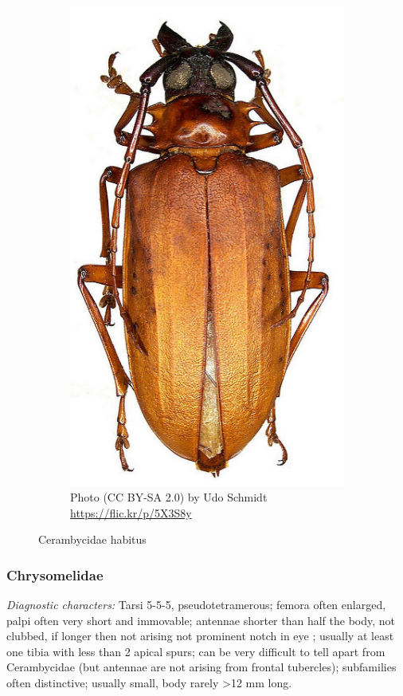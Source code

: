 \documentclass[letterpaper, 11pt]{article}
\begin{document}
\begin{figure}[ht!]
\begin{subfigure}[ht!]{0.27\textwidth}
    \includegraphics[width=\textwidth]{Cerambycid3}
  \caption{Photo (CC BY-SA 2.0) by Udo Schmidt \url{https://flic.kr/p/5X3S8y}}
  \label{fig:cerambycid3}
\end{subfigure}
    \caption{Cerambycidae habitus}\label{fig:cerambycids}
\end{figure}

\subsubsection{Chrysomelidae}
\noindent{}\textit{Diagnostic characters:} Tarsi 5-5-5, pseudotetramerous; femora often enlarged, palpi often very short and immovable; antennae shorter than half the body, not clubbed, if longer then not arising not prominent notch in eye ; usually at least one tibia with less than 2 apical spurs; can be very difficult to tell apart from Cerambycidae (but antennae are not arising from frontal tubercles); subfamilies often distinctive; usually small, body rarely \textgreater12 mm long.\\
\end{document}
